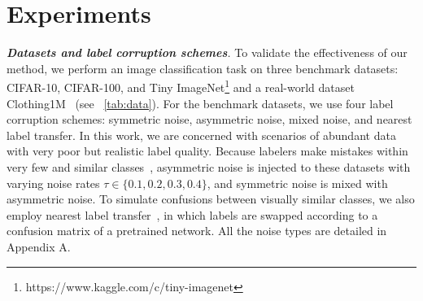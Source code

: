 \section{Experiments}

\noindent\emph{\textbf{Datasets and label corruption schemes}.}  To validate the effectiveness of our method, we perform an image classification task on three benchmark datasets: CIFAR-10\footnotemark, CIFAR-100\footnotemark[\value{footnote}],  and Tiny ImageNet\footnote{https://www.kaggle.com/c/tiny-imagenet} and a real-world dataset Clothing1M~\cite{xiao2015learning} (see \tablename~\ref{tab:data}). For the benchmark datasets, we use four label corruption schemes: symmetric noise, asymmetric noise, mixed noise, and nearest label transfer. In this work, we are concerned with scenarios of abundant data with very poor but realistic label quality. Because labelers make mistakes within very few and similar classes~\cite{han2018co,ren2018learning, yi2019probabilistic}, asymmetric noise is injected to these datasets with varying noise rates $\tau \in \{0.1, 0.2, 0.3, 0.4\}$, and symmetric noise is mixed with asymmetric noise. To simulate confusions between visually similar classes, we also employ nearest label transfer~\cite{seo2019combinatorial}, in which labels are swapped according to a confusion matrix of a pretrained network. All the noise types are detailed in Appendix A.


